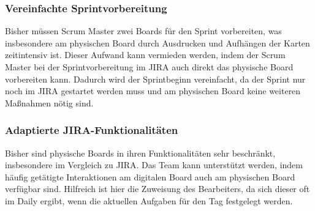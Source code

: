 \documentclass[12pt,titlepage]{scrartcl}
\begin{document}
		\subsubsection{Vereinfachte Sprintvorbereitung}
		Bisher müssen Scrum Master zwei Boards für den Sprint vorbereiten, was insbesondere am physischen Board durch Ausdrucken und Aufhängen der Karten zeitintensiv ist. Dieser Aufwand kann vermieden werden, indem der Scrum Master bei der Sprintvorbereitung im JIRA auch direkt das physische Board vorbereiten kann. Dadurch wird der Sprintbeginn vereinfacht, da der Sprint nur noch im JIRA gestartet werden muss und am physischen Board keine weiteren Maßnahmen nötig sind.
		\subsubsection{Adaptierte JIRA-Funktionalitäten}
		Bisher sind physische Boards in ihren Funktionalitäten sehr beschränkt, insbesondere im Vergleich zu JIRA. Das Team kann unterstützt werden, indem häufig getätigte Interaktionen am digitalen Board auch am physischen Board verfügbar sind. Hilfreich ist hier die Zuweisung des Bearbeiters, da sich dieser oft im Daily ergibt, wenn die aktuellen Aufgaben für den Tag festgelegt werden. 
	\newpage
\end{document}
